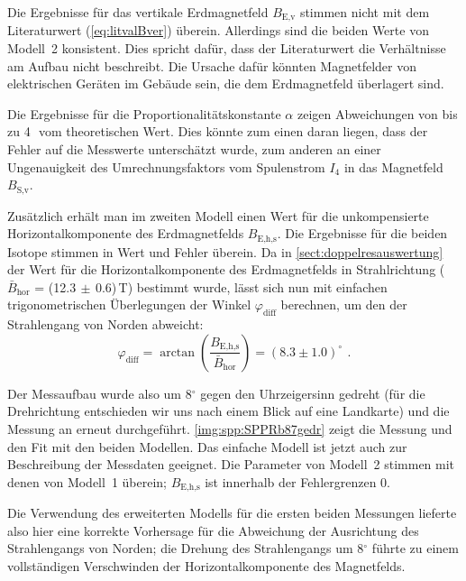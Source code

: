 Die Ergebnisse für das vertikale Erdmagnetfeld $B_\text{E,v}$ stimmen nicht mit dem Literaturwert (\autoref{eq:litvalBver}) überein.
Allerdings sind die beiden Werte von Modell~2 konsistent.
Dies spricht dafür,
dass der Literaturwert die Verhältnisse am Aufbau nicht beschreibt.
Die Ursache dafür könnten Magnetfelder von elektrischen Geräten im Gebäude sein,
die dem Erdmagnetfeld überlagert sind.


Die Ergebnisse für die Proportionalitätskonstante $\alpha$ zeigen Abweichungen von bis zu
4\,\textsigma\ vom theoretischen Wert.
Dies könnte zum einen daran liegen, dass der Fehler auf die Messwerte unterschätzt wurde,
zum anderen an einer Ungenauigkeit des Umrechnungsfaktors vom Spulenstrom $I_4$ in das Magnetfeld $B_\text{S,v}$.

Zusätzlich erhält man im zweiten Modell einen Wert für die unkompensierte Horizontalkomponente des Erdmagnetfelds $B_\text{E,h,s}$.
Die Ergebnisse für die beiden Isotope stimmen in Wert und Fehler überein.
Da in \autoref{sect:doppelresauswertung} der Wert für die Horizontalkomponente des Erdmagnetfelds in
Strahlrichtung ($\bar{B}_\text{hor}$ = (12.3$\,\pm\,$0.6)\,\textmu T) bestimmt wurde,
lässt sich nun mit einfachen trigonometrischen Überlegungen der Winkel $\varphi_\text{diff}$ berechnen,
um den der Strahlengang von Norden abweicht:
\begin{equation}
    \varphi_\text{diff} = \arctan\left( \frac{B_\text{E,h,s}}{\bar{B}_\text{hor}} \right)
    = (8.3 \pm 1.0)^\circ  \ \, .
\end{equation}

Der Messaufbau wurde also um 8$^\circ$ gegen den Uhrzeigersinn gedreht
(für die Drehrichtung entschieden wir uns nach einem Blick auf eine Landkarte)
und die Messung an  erneut durchgeführt.
\autoref{img:spp:SPPRb87gedr} zeigt die Messung und den Fit mit den beiden Modellen.
Das einfache Modell ist jetzt auch zur Beschreibung der Messdaten geeignet.
Die Parameter von Modell~2 stimmen mit denen von Modell~1 überein;
$B_\text{E,h,s}$ ist innerhalb der Fehlergrenzen 0.

Die Verwendung des erweiterten Modells für die ersten beiden Messungen lieferte also hier eine korrekte Vorhersage
für die Abweichung der Ausrichtung des Strahlengangs von Norden;
die Drehung des Strahlengangs um 8$^\circ$ führte zu einem vollständigen Verschwinden der Horizontalkomponente
des Magnetfelds.

